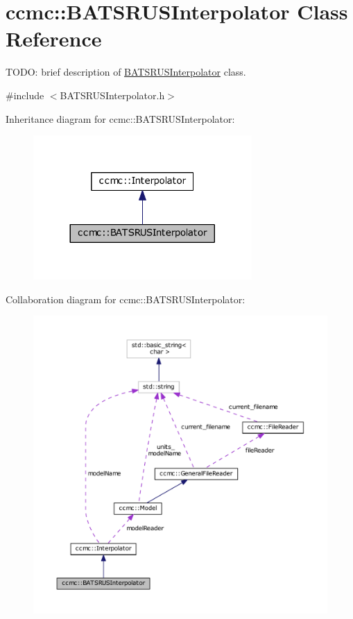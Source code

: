 \hypertarget{classccmc_1_1_b_a_t_s_r_u_s_interpolator}{\section{ccmc\-:\-:B\-A\-T\-S\-R\-U\-S\-Interpolator Class Reference}
\label{classccmc_1_1_b_a_t_s_r_u_s_interpolator}
}


T\-O\-D\-O\-: brief description of \hyperlink{classccmc_1_1_b_a_t_s_r_u_s_interpolator}{B\-A\-T\-S\-R\-U\-S\-Interpolator} class.  




{\ttfamily \#include $<$B\-A\-T\-S\-R\-U\-S\-Interpolator.\-h$>$}



Inheritance diagram for ccmc\-:\-:B\-A\-T\-S\-R\-U\-S\-Interpolator\-:
\nopagebreak
\begin{figure}[H]
\begin{center}
\leavevmode
\includegraphics[width=236pt]{classccmc_1_1_b_a_t_s_r_u_s_interpolator__inherit__graph}
\end{center}
\end{figure}


Collaboration diagram for ccmc\-:\-:B\-A\-T\-S\-R\-U\-S\-Interpolator\-:
\nopagebreak
\begin{figure}[H]
\begin{center}
\leavevmode
\includegraphics[width=350pt]{classccmc_1_1_b_a_t_s_r_u_s_interpolator__coll__graph}
\end{center}
\end{figure}
